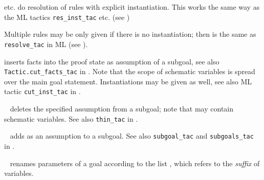 \begin{isabellebody}
\begin{isamarkuptext}
\begin{description}

  \item \hyperlink{method.rule-tac}{\mbox{}} etc. do resolution of rules with explicit
  instantiation.  This works the same way as the ML tactics \verb|res_inst_tac| etc. (see \cite{isabelle-implementation})

  Multiple rules may be only given if there is no instantiation; then
  \hyperlink{method.rule-tac}{\mbox{}} is the same as \verb|resolve_tac| in ML (see
  \cite{isabelle-implementation}).

  \item \hyperlink{method.cut-tac}{\mbox{}} inserts facts into the proof state as
  assumption of a subgoal, see also \verb|Tactic.cut_facts_tac| in
  \cite{isabelle-implementation}.  Note that the scope of schematic
  variables is spread over the main goal statement.  Instantiations
  may be given as well, see also ML tactic \verb|cut_inst_tac| in
  \cite{isabelle-implementation}.

  \item \hyperlink{method.thin-tac}{\mbox{}}~ deletes the specified assumption
  from a subgoal; note that  may contain schematic variables.
  See also \verb|thin_tac| in \cite{isabelle-implementation}.

  \item \hyperlink{method.subgoal-tac}{\mbox{}}~ adds  as an
  assumption to a subgoal.  See also \verb|subgoal_tac| and \verb|subgoals_tac| in \cite{isabelle-implementation}.

  \item \hyperlink{method.rename-tac}{\mbox{}}~ renames parameters of a
  goal according to the list , which refers to the
  \emph{suffix} of variables.


\end{description}
\end{isamarkuptext}
\end{isabellebody}
